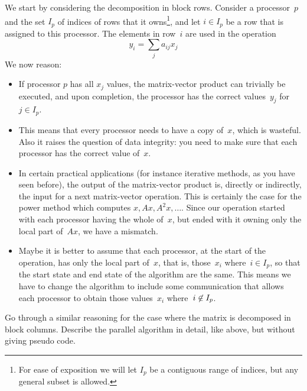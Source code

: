 We start by considering the decomposition in block rows. Consider
a processor~$p$ and the set $I_p$ of indices of rows that it
owns\footnote{For ease of exposition we will let $I_p$ be a contiguous
  range of indices, but any general subset is allowed.}, and
let $i\in I_p$ be a row that is assigned to this processor. 
The elements in
row~$i$ are used in the operation
\[ y_i=\sum_ja_{ij}x_j \]
We now reason:
\begin{itemize}
\item If processor $p$ has all $x_j$ values, the matrix-vector product
  can trivially be executed, and upon completion, the processor has
  the correct values~$y_j$ for~$j\in I_p$.
\item This means that every processor needs to have a copy of~$x$,
  which is wasteful. Also it raises the question of data integrity:
  you need to make sure that each processor has the correct value
  of~$x$.
\item In certain practical applications (for instance iterative
  methods, as you have seen before), the output of the matrix-vector
  product is, directly or indirectly, the input for a next
  matrix-vector operation. This is certainly the case for the power
  method which computes $x, Ax, A^2x,\ldots$. Since our operation
  started with each processor having the whole of~$x$, but ended with
  it owning only the local part of~$Ax$, we have a mismatch.
\item Maybe it is better to assume that each processor, at the start
  of the operation, has only the local part of~$x$, that is,
  those~$x_i$ where~$i\in I_p$, so that the start state and end state
  of the algorithm are the same. This means we have to change the
  algorithm to include some communication that allows each processor
  to obtain those values~$x_i$ where~$i\not\in\nobreak I_p$.
\end{itemize}

\begin{exercise}
  Go through a similar reasoning for the case where the matrix is
  decomposed in block columns. Describe the parallel algorithm in
  detail, like above, but without giving pseudo code.
\end{exercise}

\def\sublocal{_{\mathrm\scriptstyle local}}

